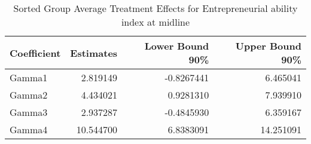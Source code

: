 \begin{table}

\caption{\label{tab:gatesREntrep_total}Sorted Group Average Treatment Effects for Entrepreneurial ability index at midline}
\centering
\begin{tabular}[t]{lrrr}
\toprule
Coefficient & Estimates & Lower Bound 90\% & Upper Bound 90\%\\
\midrule
Gamma1 & 2.819149 & -0.8267441 & 6.465041\\
Gamma2 & 4.434021 & 0.9281310 & 7.939910\\
Gamma3 & 2.937287 & -0.4845930 & 6.359167\\
Gamma4 & 10.544700 & 6.8383091 & 14.251091\\
\bottomrule
\end{tabular}
\end{table}
